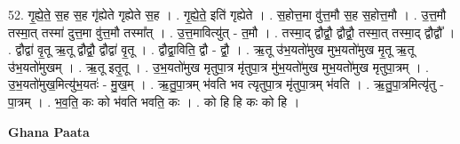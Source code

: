 \documentclass[17pt]{extarticle}
\begin{document}
52. गृ॒ह्ये॒ते॒ स॒ह स॒ह गृ॑ह्येते गृह्येते स॒ह । . गृ॒ह्ये॒ते॒ इति॑ गृह्येते । . स॒होत्त॒मा वु॑त्त॒मौ स॒ह स॒होत्त॒मौ । . उ॒त्त॒मौ तस्मा॒त् तस्मा॑ दुत्त॒मा वु॑त्त॒मौ तस्मा᳚त् । . उ॒त्त॒मावित्यु॑त् - त॒मौ । . तस्मा॒द् द्वौद्वौ॒ द्वौद्वौ॒ तस्मा॒त् तस्मा॒द् द्वौद्वौ᳚ । . द्वौद्वा॑ वृ॒तू ऋ॒तू द्वौद्वौ॒ द्वौद्वा॑ वृ॒तू । . द्वौद्वा॒विति॒ द्वौ - द्वौ॒ । . ऋ॒तू उ॑भ॒यतो॑मुख मुभ॒यतो॑मुख मृ॒तू ऋ॒तू उ॑भ॒यतो॑मुखम् । . ऋ॒तू इतृ॒तू । . उ॒भ॒यतो॑मुख मृतुपा॒त्र मृ॑तुपा॒त्र मु॑भ॒यतो॑मुख मुभ॒यतो॑मुख मृतुपा॒त्रम् । . उ॒भ॒यतो॑मुख॒मित्यु॑भ॒यतः॑ - मु॒ख॒म् । . ऋ॒तु॒पा॒त्रम् भ॑वति भव त्यृतुपा॒त्र मृ॑तुपा॒त्रम् भ॑वति । . ऋ॒तु॒पा॒त्रमित्यृ॑तु - पा॒त्रम् । . भ॒व॒ति॒ कः को भ॑वति भवति॒ कः । . को हि हि कः को हि । \newline

\textbf{Ghana Paata } \newline
\end{document}
